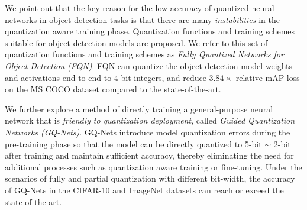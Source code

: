 We point out that the key reason for the low accuracy of quantized neural networks in object detection tasks is that there are many \emph{instabilities} in the quantization aware training phase. Quantization functions and training schemes suitable for object detection models are proposed. We refer to this set of quantization functions and training schemes as \emph{Fully Quantized Networks for Object Detection (FQN)}. FQN can quantize the object detection model weights and activations end-to-end to 4-bit integers, and reduce $3.84\times$ relative mAP loss on the MS COCO dataset compared to the state-of-the-art.

We further explore a method of directly training a general-purpose neural network that is \emph{friendly to quantization deployment}, called \emph{Guided Quantization Networks (GQ-Nets)}. GQ-Nets introduce model quantization errors during the pre-training phase so that the model can be directly quantized to 5-bit $\sim$ 2-bit after training and maintain sufficient accuracy, thereby eliminating the need for additional processes such as quantization aware training or fine-tuning. Under the scenarios of fully and partial quantization with different bit-width, the accuracy of GQ-Nets in the CIFAR-10 and ImageNet datasets can reach or exceed the state-of-the-art.

